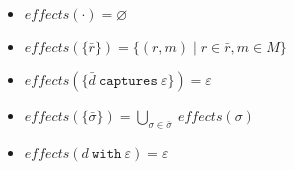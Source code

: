 \documentclass{article}
\newcommand{\keywadj}[1]{\mathtt{#1}}
\newcommand{\keyw}[1]{\keywadj{#1}~}
\begin{document}
\begin{itemize}
	\item $effects(\cdot) = \varnothing$
	\item $effects(\{\bar r\}) = \{ (r, m) \mid r \in \bar r, m \in M \}$
	\item $effects(\{ \bar d~\keyw{captures} \varepsilon \}) = \varepsilon$
	\item $effects( \{ \bar \sigma \}) = \bigcup_{\sigma \in \bar \sigma}~effects(\sigma)$
	\item $effects(d~\keyw{with} \varepsilon) = \varepsilon$
\end{itemize}
\end{document}
